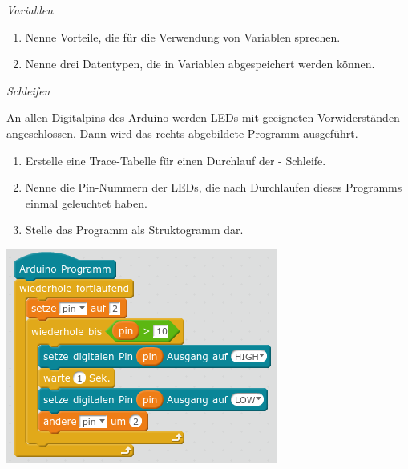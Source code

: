 \begin{aufgabe} \emph{Variablen}
	\begin{enumerate}[label=\alph*),itemsep=0mm, parsep=0mm]
		\item Nenne Vorteile, die für die Verwendung von Variablen sprechen.
		\item Nenne drei Datentypen, die in Variablen abgespeichert werden können.
	\end{enumerate}
\end{aufgabe}

\begin{aufgabe} \emph{Schleifen}
	\medskip
	
	\begin{minipage}{0.6\textwidth}
		An allen Digitalpins des Arduino werden LEDs mit geeigneten Vorwiderständen angeschlossen. Dann wird das rechts abgebildete Programm ausgeführt.
		\begin{enumerate}[label=\alph*),itemsep=0mm, parsep=0mm]
			\item Erstelle eine Trace-Tabelle für einen Durchlauf der - Schleife.
			\item Nenne die Pin-Nummern der LEDs, die nach Durchlaufen dieses Programms einmal geleuchtet haben.
			\item Stelle das Programm als Struktogramm dar.
		\end{enumerate}
	\end{minipage}
	\hfill
	\begin{minipage}{0.38\textwidth}
		\centering
		\includegraphics[width=\textwidth]{./pics/programm-trace-uebung.png}
	\end{minipage}
\end{aufgabe}

